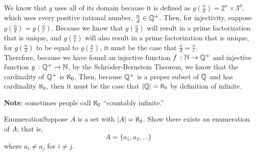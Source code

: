{                \noindent We know that \(g\) uses all of its domain because it is defined as \(g(\frac{n}{d}) = 2^n \times 3^d\), which uses every positive rational number, \(\frac{n}{d} \in \mathbb{Q}^+\). Then, for injectivity, suppose \(g(\frac{n}{d}) = g(\frac{a}{c})\). Because we know that \(g(\frac{n}{d})\) will result in a prime factorization that is unique, and \(g(\frac{a}{c})\) will also result in a prime factorization that is unique, for \(g(\frac{n}{d})\) to be equal to \(g(\frac{a}{c})\), it must be the case that \(\frac{n}{d} = \frac{a}{c}\). \\

                \noindent Therefore, because we have found an injective function \(f \ \colon \mathbb{N} \rightarrow \mathbb{Q}^+\) and injective function \(g \ \colon \mathbb{Q}^+ \rightarrow \mathbb{N}\), by the Schröder-Bernstein Theorem, we know that the cardinality of \(\mathbb{Q}^+\) is \(\aleph_0\). Then, because \(\mathbb{Q}^+\) is a proper subset of \(\mathbb{Q}\) and has cardinality \(\aleph_0\), then it must be the case that \(|\mathbb{Q}| = \aleph_0\) by definition of infinite. 
            }
            
            \textbf{Note}: sometimes people call \(\aleph_0\) ``countably infinite.'' \\


            \begin{exercise}
                {Enumeration}Suppose \(A\) is a set with \(|A| = \aleph_0\). Show there exists an enumeration of \(A\); that is, \[A = \{a_1,a_2,\dots\}\] where \(a_i \ne a_j\) for \(i \ne j\).
            \end{exercise}



